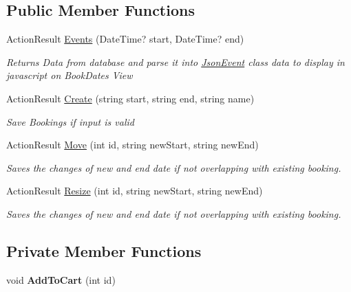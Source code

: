 \subsection*{Public Member Functions}
\begin{DoxyCompactItemize}
\item 
Action\+Result \hyperlink{class_alfa_accounting_1_1_controllers_1_1_backend_controller_a29bbe3f91ac31b8d2d639fdf6fb3de04}{Events} (Date\+Time? start, Date\+Time? end)
\begin{DoxyCompactList}\small\item\em Returns Data from database and parse it into \hyperlink{class_alfa_accounting_1_1_controllers_1_1_backend_controller_1_1_json_event}{Json\+Event} class data to display in javascript on Book\+Dates View \end{DoxyCompactList}\item 
Action\+Result \hyperlink{class_alfa_accounting_1_1_controllers_1_1_backend_controller_a49fa4ed8afd915ec1fc3fdb15648df79}{Create} (string start, string end, string name)
\begin{DoxyCompactList}\small\item\em Save Bookings if input is valid \end{DoxyCompactList}\item 
Action\+Result \hyperlink{class_alfa_accounting_1_1_controllers_1_1_backend_controller_ac3545457982cef819857e69e7dcc95e0}{Move} (int id, string new\+Start, string new\+End)
\begin{DoxyCompactList}\small\item\em Saves the changes of new and end date if not overlapping with existing booking. \end{DoxyCompactList}\item 
Action\+Result \hyperlink{class_alfa_accounting_1_1_controllers_1_1_backend_controller_a0f789965f089440810d26b4c1d5f301b}{Resize} (int id, string new\+Start, string new\+End)
\begin{DoxyCompactList}\small\item\em Saves the changes of new and end date if not overlapping with existing booking. \end{DoxyCompactList}\end{DoxyCompactItemize}
\subsection*{Private Member Functions}
\begin{DoxyCompactItemize}
\item 
\mbox{\label{class_alfa_accounting_1_1_controllers_1_1_backend_controller_aaf9281580fab05b2fa5ef047efa5a32a}} 
void {\bfseries Add\+To\+Cart} (int id)
\end{DoxyCompactItemize}
